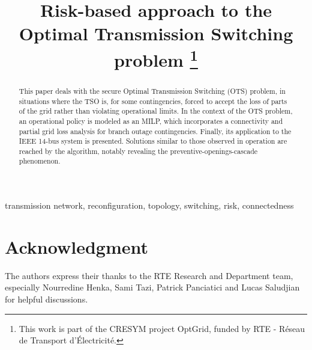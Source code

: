 \documentclass[conference]{IEEEtran}
\begin{document}
    \title{Risk-based approach to the Optimal Transmission Switching problem
    \thanks{This work is part of the CRESYM project OptGrid, funded by RTE - Réseau de Transport d'Électricité.}
    }

    \author{ 
    \and {} 
    }

    \maketitle

    \begin{abstract}
        This paper deals with the secure Optimal Transmission Switching (OTS) problem, in situations where the TSO is, for some contingencies, forced to accept the loss of parts of the grid rather than violating operational limits. In the context of the OTS problem, an operational policy is modeled as an MILP, which incorporates a connectivity and partial grid loss analysis for branch outage contingencies.  Finally, its application to the IEEE 14-bus system is presented. Solutions similar to those observed in operation are reached by the algorithm, notably revealing the preventive-openings-cascade phenomenon. 
    \end{abstract}

    \begin{IEEEkeywords}
        transmission network, reconfiguration, topology, switching, risk,
        connectedness
    \end{IEEEkeywords}

    
    
    
    
    
    
    \section*{Acknowledgment}
    The authors express their thanks to the 
    RTE Research and Department team,  especially Nourredine
    Henka, Sami Tazi, Patrick Panciatici and Lucas Saludjian for helpful discussions.

    
    
\end{document}
